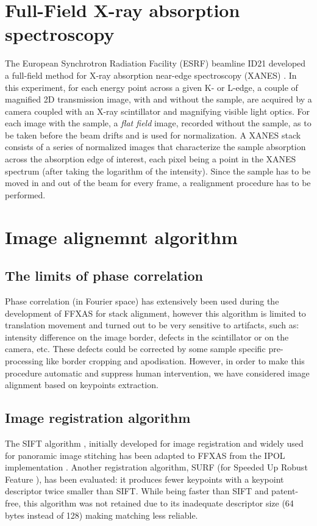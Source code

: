 \documentclass[preprint]{iucr}
\begin{document}
\section{Full-Field X-ray absorption spectroscopy}
The European Synchrotron Radiation Facility (ESRF) beamline ID21 developed a
full-field method for X-ray absorption near-edge spectroscopy
(XANES) \cite{andrade,fullfield}. 
In this experiment, for each energy point across a given K- or L-edge, 
a couple of magnified 2D transmission image, with and without the sample, 
are acquired by a camera coupled with an 
X-ray scintillator and magnifying visible light optics.
For each image with the sample, a \emph{flat field} image, recorded
without the sample, as to be taken before the beam drifts and is used for
normalization.
A XANES stack consists of a series of normalized images that characterize the
sample absorption across the absorption edge of interest, each pixel being a
point in the XANES spectrum (after taking the logarithm of the intensity).
Since the sample has to be moved in and out of the beam for every frame, a
realignment procedure has to be performed.


\section{Image alignemnt algorithm}

\subsection{The limits of phase correlation}

Phase correlation (in Fourier space) has extensively been used during the
development of FFXAS for stack alignment, however this algorithm is limited to
translation movement and turned out to be very sensitive to artifacts, such as:
intensity difference on the image border, defects in the scintillator or on
the camera, etc.
These defects could be corrected by some sample
specific pre-processing like border cropping and apodisation. 
However, in order to make this procedure automatic and suppress human intervention, we
have considered image alignment based on keypoints extraction.

\subsection{Image registration algorithm}

The SIFT algorithm \cite{Lowe99,Lowe04}, initially developed
for image registration and widely used for panoramic image stitching has been
adapted to FFXAS from the IPOL implementation \cite{ASIFT}.
Another registration algorithm, SURF (for Speeded Up Robust Feature
\cite{surf}), has been evaluated: it produces fewer keypoints with a keypoint
descriptor twice smaller than SIFT. 
While being faster than SIFT and patent-free, this algorithm was not
retained due to its inadequate descriptor size (64 bytes instead of 128)
making matching less reliable.
\end{document}
